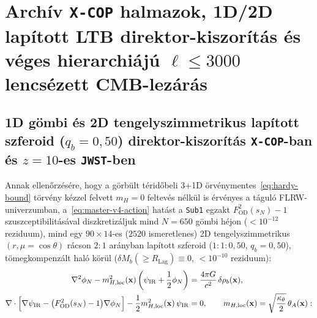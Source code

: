 \documentclass[11pt,a4paper]{article}
\begin{document}
\section{Archív \texttt{X-COP} halmazok, 1D/2D lapított LTB direktor-kiszorítás és véges hierarchiájú \texorpdfstring{$\ell \le 3000$}{l <= 3000} lencsézett CMB-lezárás}
\label{sec:boltzmann-ee}

\subsection{1D gömbi és 2D tengelyszimmetrikus lapított szferoid (\texorpdfstring{$q_b = 0{,}50$}{q\_b = 0,50}) direktor-kiszorítás \texttt{X-COP}-ban és \texorpdfstring{$z = 10$}{z = 10}-es \texttt{JWST}-ben}
Annak ellenőrzésére, hogy a görbült téridőbeli 3+1D örvénymentes~\eqref{eq:hardy-bound} törvény kézzel felvett $m_H = 0$ feltevés nélkül is érvényes a táguló FLRW-univerzumban, a~\eqref{eq:master-v4-action} hatást a {\upshape\texttt{Sub1}} egzakt $F_{\mathrm{OD}}^2(s_N) - 1$ szuszceptibilitásával diszkretizáljuk mind $N = 650$ gömbi héjon ($< 10^{-12}$ reziduum), mind egy $90\times 14$-es ($2520$ ismeretlenes) 2D tengelyszimmetrikus $(r, \mu = \cos\theta)$ rácson $2\!:\!1$ arányban lapított szferoid ($1\!:\!1\!:\!0{,}50$, $q_b = 0{,}50$), tömegkompenzált haló körül ($\delta M_b(\ge R_{\mathrm{Lag}}) \equiv 0$, $< 10^{-10}$ reziduum):
\begin{equation}
\begin{aligned}
  \nabla^2\phi_N - m_{H,\mathrm{loc}}^2(\mathbf{x})\left(\psi_{\mathrm{IR}} + \frac{1}{2}\phi_N\right) &= \frac{4\pi G}{c^2}\,\delta\rho_b(\mathbf{x}), \\
  \nabla\cdot\Bigl[\nabla\psi_{\mathrm{IR}} - \bigl(F_{\mathrm{OD}}^2(s_N) - 1\bigr)\nabla\phi_N\Bigr] - \frac{1}{2}m_{H,\mathrm{loc}}^2(\mathbf{x})\,\psi_{\mathrm{IR}} &= 0, \qquad m_{H,\mathrm{loc}}(\mathbf{x}) = \sqrt{\frac{\kappa_\theta}{2}}\,\theta_A(\mathbf{x}):
\end{aligned}
\label{eq:ltb-bvp}
\end{equation}
\end{document}
